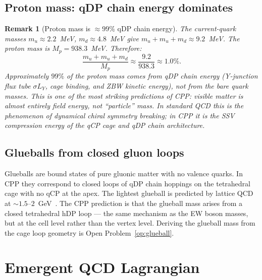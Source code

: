 \documentclass[11pt,a4paper]{article}
\newtheorem{remark}[theorem]{Remark}
\begin{document}
\subsection{Proton mass: qDP chain energy dominates}

\begin{remark}[Proton mass is $\approx99\%$ qDP chain energy]
\label{rem:proton_mass}
The current-quark masses $m_u \approx 2.2$~MeV, $m_d \approx 4.8$~MeV
give $m_u + m_u + m_d \approx 9.2$~MeV.  The proton mass is
$M_p = 938.3$~MeV.  Therefore:
\begin{equation}
\frac{m_u+m_u+m_d}{M_p} \approx \frac{9.2}{938.3} \approx 1.0\%.
\label{eq:proton_chain_fraction}
\end{equation}
Approximately $99\%$ of the proton mass comes from qDP chain energy
(Y-junction flux tube $\sigma L_Y$, cage binding, and ZBW kinetic
energy), not from the bare quark masses.  This is one of the most
striking predictions of CPP: visible matter is almost entirely
field energy, not ``particle'' mass.  In standard QCD this is
the phenomenon of dynamical chiral symmetry breaking; in CPP it
is the SSV compression energy of the qCP cage and qDP chain
architecture.
\end{remark}

\subsection{Glueballs from closed gluon loops}

Glueballs are bound states of pure gluonic matter with no valence
quarks.  In CPP they correspond to closed loops of qDP chain
hoppings on the tetrahedral cage with no qCP at the apex.  The
lightest glueball is predicted by lattice QCD at
$\sim1.5$--$2$~GeV~\citep{morningstar1999}.  The CPP prediction
is that the glueball mass arises from a closed tetrahedral hDP
loop --- the same mechanism as the EW boson masses, but at the
cell level rather than the vertex level.  Deriving the glueball
mass from the cage loop geometry is Open Problem~\ref{op:glueball}.

\section{Emergent QCD Lagrangian}
\label{sec:lagrangian}
\end{document}
